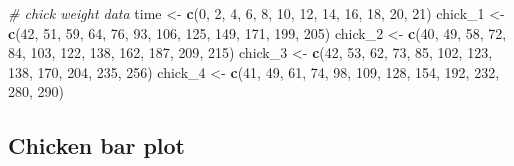 \documentclass[]{book}
\newenvironment{Shaded}{\begin{snugshade}}{\end{snugshade}}
\newcommand{\CommentTok}[1]{\textcolor[rgb]{0.56,0.35,0.01}{\textit{#1}}}
\newcommand{\DecValTok}[1]{\textcolor[rgb]{0.00,0.00,0.81}{#1}}
\newcommand{\KeywordTok}[1]{\textcolor[rgb]{0.13,0.29,0.53}{\textbf{#1}}}
\newcommand{\NormalTok}[1]{#1}
\newcommand{\StringTok}[1]{\textcolor[rgb]{0.31,0.60,0.02}{#1}}
\begin{document}
\begin{Shaded}
\begin{Highlighting}[]
\CommentTok{# chick weight data}
\NormalTok{time <-}\StringTok{ }\KeywordTok{c}\NormalTok{(}\DecValTok{0}\NormalTok{, }\DecValTok{2}\NormalTok{, }\DecValTok{4}\NormalTok{, }\DecValTok{6}\NormalTok{, }\DecValTok{8}\NormalTok{, }\DecValTok{10}\NormalTok{, }\DecValTok{12}\NormalTok{, }\DecValTok{14}\NormalTok{, }\DecValTok{16}\NormalTok{, }\DecValTok{18}\NormalTok{, }\DecValTok{20}\NormalTok{, }\DecValTok{21}\NormalTok{)}
\NormalTok{chick_}\DecValTok{1}\NormalTok{ <-}\StringTok{ }\KeywordTok{c}\NormalTok{(}\DecValTok{42}\NormalTok{, }\DecValTok{51}\NormalTok{, }\DecValTok{59}\NormalTok{, }\DecValTok{64}\NormalTok{, }\DecValTok{76}\NormalTok{, }\DecValTok{93}\NormalTok{, }\DecValTok{106}\NormalTok{, }\DecValTok{125}\NormalTok{, }\DecValTok{149}\NormalTok{, }\DecValTok{171}\NormalTok{, }\DecValTok{199}\NormalTok{, }\DecValTok{205}\NormalTok{)}
\NormalTok{chick_}\DecValTok{2}\NormalTok{ <-}\StringTok{ }\KeywordTok{c}\NormalTok{(}\DecValTok{40}\NormalTok{, }\DecValTok{49}\NormalTok{, }\DecValTok{58}\NormalTok{, }\DecValTok{72}\NormalTok{, }\DecValTok{84}\NormalTok{, }\DecValTok{103}\NormalTok{, }\DecValTok{122}\NormalTok{, }\DecValTok{138}\NormalTok{, }\DecValTok{162}\NormalTok{, }\DecValTok{187}\NormalTok{, }\DecValTok{209}\NormalTok{, }\DecValTok{215}\NormalTok{)}
\NormalTok{chick_}\DecValTok{3}\NormalTok{ <-}\StringTok{ }\KeywordTok{c}\NormalTok{(}\DecValTok{42}\NormalTok{, }\DecValTok{53}\NormalTok{, }\DecValTok{62}\NormalTok{, }\DecValTok{73}\NormalTok{, }\DecValTok{85}\NormalTok{, }\DecValTok{102}\NormalTok{, }\DecValTok{123}\NormalTok{, }\DecValTok{138}\NormalTok{, }\DecValTok{170}\NormalTok{, }\DecValTok{204}\NormalTok{, }\DecValTok{235}\NormalTok{, }\DecValTok{256}\NormalTok{)}
\NormalTok{chick_}\DecValTok{4}\NormalTok{ <-}\StringTok{ }\KeywordTok{c}\NormalTok{(}\DecValTok{41}\NormalTok{, }\DecValTok{49}\NormalTok{, }\DecValTok{61}\NormalTok{, }\DecValTok{74}\NormalTok{, }\DecValTok{98}\NormalTok{, }\DecValTok{109}\NormalTok{, }\DecValTok{128}\NormalTok{, }\DecValTok{154}\NormalTok{, }\DecValTok{192}\NormalTok{, }\DecValTok{232}\NormalTok{, }\DecValTok{280}\NormalTok{, }\DecValTok{290}\NormalTok{)}
\end{Highlighting}
\end{Shaded}

\hypertarget{chicken-bar-plot}{%
\subsection{Chicken bar plot}\label{chicken-bar-plot}}
\end{document}
